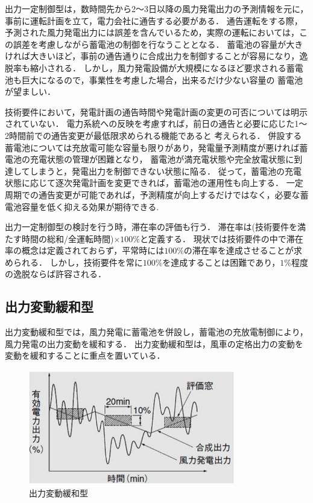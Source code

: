 \documentclass[a4paper,12pt,showkeys]{jreport}
\begin{document}
出力一定制御型は，数時間先から2～3日以降の風力発電出力の予測情報を元に，事前に運転計画を立て，電力会社に通告する必要がある．
通告運転をする際，予測された風力発電出力には誤差を含んでいるため，実際の運転においては，この誤差を考慮しながら蓄電池の制御を行なうこととなる．
蓄電池の容量が大きければ大きいほど，事前の通告通りに合成出力を制御することが容易になり，逸脱率も縮小される．
しかし，風力発電設備が大規模になるほど要求される蓄電池も巨大になるので，事業性を考慮した場合，出来るだけ少ない容量の
蓄電池が望ましい．

技術要件において，発電計画の通告時間や発電計画の変更の可否については明示されていない．
電力系統への反映を考慮すれば，前日の通告と必要に応じた1～2時間前での通告変更が最低限求められる機能であると
考えられる．
併設する蓄電池については充放電可能な容量も限りがあり，発電量予測精度が悪ければ蓄電池の充電状態の管理が困難となり，
蓄電池が満充電状態や完全放電状態に到達してしまうと，発電出力を制御できない状態に陥る．
従って，蓄電池の充電状態に応じて逐次発電計画を変更できれば，蓄電池の運用性も向上する．
一定周期での通告変更が可能であれば，予測精度が向上するだけではなく，必要な蓄電池容量を低く抑える効果が期待できる.

出力一定制御型の検討を行う時，滞在率の評価も行う．
滞在率は(技術要件を満たす時間の総和/全運転時間)$\times$$100\%$と定義する．
現状では技術要件の中で滞在率の概念は定義されておらず，平常時には$100\%$の滞在率を達成させることが求められる．
しかし，技術要件を常に$100\%$を達成することは困難であり，$1\%$程度の逸脱ならば許容される\cite{電力}．

\subsection{出力変動緩和型}

出力変動緩和型では，風力発電に蓄電池を併設し，蓄電池の充放電制御により，風力発電の出力変動を緩和する．
出力変動緩和型は，風車の定格出力の変動を変動を緩和することに重点を置いている．

\begin{figure}[h]
\centering
\includegraphics[width=9cm,height=5cm, clip]{seigyo2.eps}
\caption{出力変動緩和型\cite{風力}}
\label{fig:seigyo2}
\end{figure}
\end{document}

